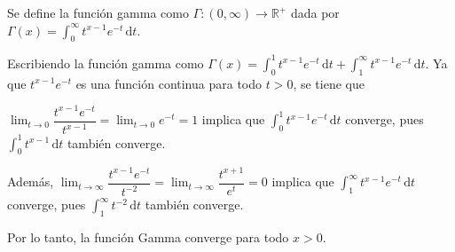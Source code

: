 \documentclass[fleqn]{article}
\newenvironment{definicion}[1]{\begin{defi}[breakable, pad at break = 5mm, leftrule = 0.7mm, rightrule = 0.7mm, right = 2mm, left = 2mm, enlarge bottom finally by = 3mm]{}{#1}}{\end{defi}}
\newcommand{\real}{\mathbb{R}}
\newcommand{\intg}[4]{\int_{#1}^{#2} \!\! #3 \, \mathrm{d} #4}
\begin{document}
	\vspace{9mm}

	\begin{definicion}{}{}
		Se define la función gamma como $ \Gamma \colon (0, \infty) \to \real^+ $ dada por $ \displaystyle \Gamma(x) = \intg{0}{\infty}{t^{x-1} e^{-t}}{t} $. 

		\tcblower

		Escribiendo la función gamma como $ \Gamma(x) = \intg{0}{1}{t^{x-1} e^{-t}}{t} + \intg{1}{\infty}{t^{x-1} e^{-t}}{t} $. Ya que $ t^{x-1} e^{-t} $ es una función continua para todo $ t > 0 $, se tiene que
		
		$ \displaystyle \lim_{t \to 0} \dfrac{t^{x-1} e^{-t}}{t^{x-1}} = \lim_{t \to 0} e^{-t} = 1 $ implica que $ \intg{0}{1}{t^{x-1} e^{-t}}{t} $ converge, pues $ \intg{0}{1}{t^{x-1}}{t} $ también converge. 
		
		Además, $ \displaystyle \lim_{t \to \infty} \dfrac{t^{x-1} e^{-t}}{t^{-2}} = \lim_{t \to \infty} \dfrac{t^{x+1}}{e^t} = 0 $ implica que $ \intg{1}{\infty}{t^{x-1} e^{-t}}{t} $ converge, pues $ \intg{1}{\infty}{t^{-2}}{t} $ también converge.

		Por lo tanto, la función Gamma converge para todo $ x > 0 $.
	\end{definicion}
\end{document}
